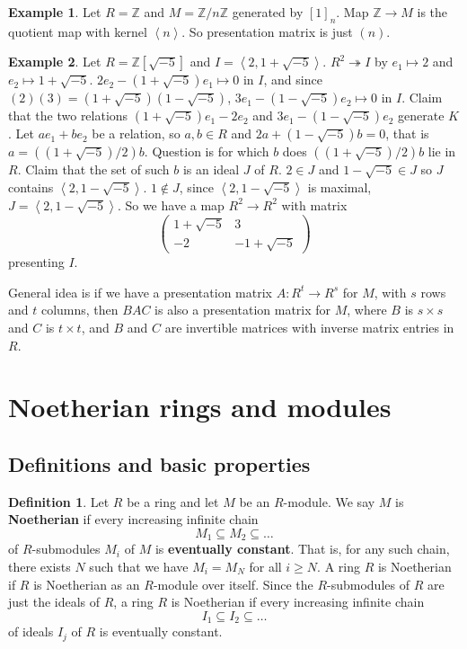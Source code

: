 \documentclass{article}
\newcommand{\Z}{\mathbb{Z}}
\newcommand{\rb}[1]{\left( #1 \right)}
\renewcommand{\sb}[1]{\left[ #1 \right]}
\newcommand{\ab}[1]{\left\langle #1 \right\rangle}
\newcommand{\two}[2]{\begin{pmatrix} #1 \\ #2 \end{pmatrix}}
\theoremstyle{definition}\newtheorem{definition}{Definition}[subsection]
\theoremstyle{definition}\newtheorem{remark}[definition]{Remark}
\theoremstyle{definition}\newtheorem*{example}{Example}
\theoremstyle{definition}\newtheorem*{note}{Note}
\begin{document}
\begin{example}
Let $ R = \Z $ and $ M = \Z / n\Z $ generated by $ \sb{1}_n $. Map $ \Z \to M $ is the quotient map with kernel $ \ab{n} $. So presentation matrix is just $ \rb{n} $.
\end{example}

\begin{example}
Let $ R = \Z\sb{\sqrt{-5}} $ and $ I = \ab{2, 1 + \sqrt{-5}} $. $ R^2 \twoheadrightarrow I $ by $ e_1 \mapsto 2 $ and $ e_2 \mapsto 1 + \sqrt{-5} $. $ 2e_2 - \rb{1 + \sqrt{-5}}e_1 \mapsto 0 $ in $ I $, and since $ \rb{2}\rb{3} = \rb{1 + \sqrt{-5}}\rb{1 - \sqrt{-5}} $, $ 3e_1 - \rb{1 - \sqrt{-5}}e_2 \mapsto 0 $ in $ I $. Claim that the two relations $ \rb{1 + \sqrt{-5}}e_1 - 2e_2 $ and $ 3e_1 - \rb{1 - \sqrt{-5}}e_2 $ generate $ K $. Let $ ae_1 + be_2 $ be a relation, so $ a, b \in R $ and $ 2a + \rb{1 - \sqrt{-5}}b = 0 $, that is $ a = \rb{\rb{1 + \sqrt{-5}} / 2}b $. Question is for which $ b $ does $ \rb{\rb{1 + \sqrt{-5}} / 2}b $ lie in $ R $. Claim that the set of such $ b $ is an ideal $ J $ of $ R $. $ 2 \in J $ and $ 1 - \sqrt{-5} \in J $ so $ J $ contains $ \ab{2, 1 - \sqrt{-5}} $. $ 1 \notin J $, since $ \ab{2, 1 - \sqrt{-5}} $ is maximal, $ J = \ab{2, 1 - \sqrt{-5}} $. So we have a map $ R^2 \to R^2 $ with matrix
$$ \two{1 + \sqrt{-5} & 3}{-2 & -1 + \sqrt{-5}} $$
presenting $ I $.
\end{example}

General idea is if we have a presentation matrix $ A : R^t \to R^s $ for $ M $, with $ s $ rows and $ t $ columns, then $ BAC $ is also a presentation matrix for $ M $, where $ B $ is $ s \times s $ and $ C $ is $ t \times t $, and $ B $ and $ C $ are invertible matrices with inverse matrix entries in $ R $.

\section{Noetherian rings and modules}

\subsection{Definitions and basic properties}

\begin{definition}
Let $ R $ be a ring and let $ M $ be an $ R $-module. We say $ M $ is \textbf{Noetherian} if every increasing infinite chain
$$ M_1 \subseteq M_2 \subseteq \dots $$
of $ R $-submodules $ M_i $ of $ M $ is \textbf{eventually constant}. That is, for any such chain, there exists $ N $ such that we have $ M_i = M_N $ for all $ i \ge N $. A ring $ R $ is Noetherian if $ R $ is Noetherian as an $ R $-module over itself. Since the $ R $-submodules of $ R $ are just the ideals of $ R $, a ring $ R $ is Noetherian if every increasing infinite chain
$$ I_1 \subseteq I_2 \subseteq \dots $$
of ideals $ I_j $ of $ R $ is eventually constant.
\end{definition}
\end{document}
